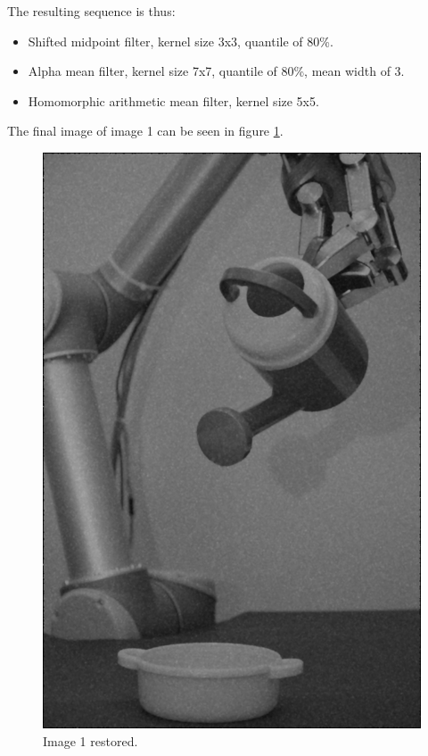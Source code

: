 The resulting sequence is thus:
\begin{itemize}
 \item Shifted midpoint filter, kernel size 3x3, quantile of 80\%.
 \item Alpha mean filter, kernel size 7x7, quantile of 80\%, mean width of 3.
 \item Homomorphic arithmetic mean filter, kernel size 5x5.
\end{itemize}

The final image of image 1 can be seen in figure \ref{fig:final_image1}.

\begin{figure}[H]
\centering
\includegraphics[width = \fullImageWidth]{../code/images/image_result_1.png}
\caption{Image 1 restored.}
\label{fig:final_image1}
\end{figure}
